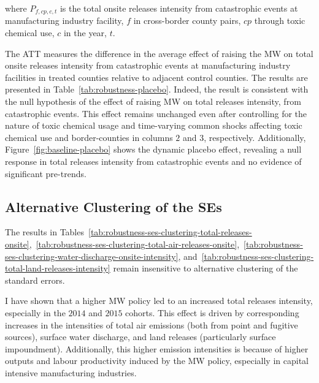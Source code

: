 \documentclass[authoryear, preprint, twocolumn, 1p]{elsarticle}
\begin{document}
    where $P_{f,cp,c,t}$ is the total onsite releases intensity from catastrophic events at manufacturing industry facility, $f$ in cross-border county pairs, $cp$ through toxic chemical use, $c$ in the year, $t$.

    The ATT measures the difference in the average effect of raising the MW on total onsite releases intensity from catastrophic events at manufacturing industry facilities in treated counties relative to adjacent control counties. The results are presented in Table~\ref{tab:robustness-placebo}. Indeed, the result is consistent with the null hypothesis of the effect of raising MW on total releases intensity, from catastrophic events. This effect remains unchanged even after controlling for the nature of toxic chemical usage and time-varying common shocks affecting toxic chemical use and border-counties in columns $2$ and $3$, respectively. Additionally, Figure~\ref{fig:baseline-placebo} shows the dynamic placebo effect, revealing a null response in total releases intensity from catastrophic events and no evidence of significant pre-trends.
    

    \subsection{Alternative Clustering of the SEs}\label{subsec:alternative-clustering-of-the-ses}
    The results in Tables~\ref{tab:robustness-ses-clustering-total-releases-onsite},~\ref{tab:robustness-ses-clustering-total-air-releases-onsite},~\ref{tab:robustness-ses-clustering-water-discharge-onsite-intensity}, and~\ref{tab:robustness-ses-clustering-total-land-releases-intensity} remain insensitive to alternative clustering of the standard errors.
    
    
    
    

    I have shown that a higher MW policy led to an increased total releases intensity, especially in the $2014$ and $2015$ cohorts. This effect is driven by corresponding increases in the intensities of total air emissions (both from point and fugitive sources), surface water discharge, and land releases (particularly surface impoundment). Additionally, this higher emission intensities is because of higher outputs and labour productivity induced by the MW policy, especially in capital intensive manufacturing industries.
\end{document}
